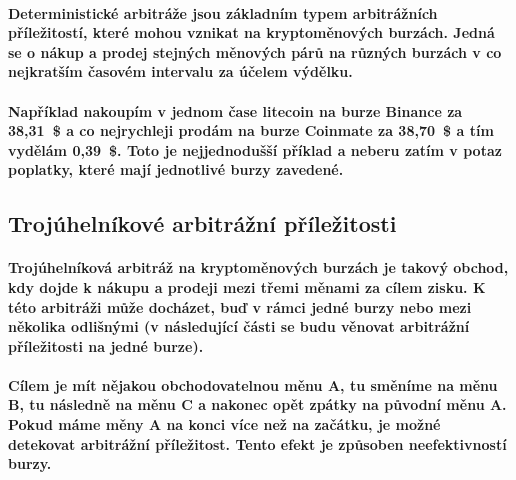 \documentclass[thesis=B,czech]{FITthesis}[2019/03/21]
\begin{document}
\paragraph{
Deterministické arbitráže jsou základním typem arbitrážních příležitostí, které mohou vznikat na kryptoměnových burzách. Jedná se o nákup a prodej stejných měnových párů na různých burzách v co nejkratším časovém intervalu za účelem výdělku. \cite{CZInvestor} \cite{TowardsDataScience}
}
\paragraph{
Například nakoupím v jednom čase litecoin na burze Binance za 38,31~\$ a co nejrychleji prodám na burze Coinmate za 38,70~\$ a tím vydělám 0,39~\$. Toto je nejjednodušší příklad a neberu zatím v potaz poplatky, které mají jednotlivé burzy zavedené. 
}
\subsection{Trojúhelníkové arbitrážní příležitosti}
\paragraph{
Trojúhelníková arbitráž na kryptoměnových burzách je takový obchod, kdy dojde k nákupu a prodeji mezi třemi měnami za cílem zisku. K této arbitráži může docházet, buď v rámci jedné burzy nebo mezi několika odlišnými (v následující části se budu věnovat arbitrážní příležitosti na jedné burze). \cite{TradingStrategy}
}
\paragraph{
Cílem je mít nějakou obchodovatelnou měnu A, tu směníme na měnu B, tu následně na měnu C a nakonec opět zpátky na původní měnu A. Pokud máme měny A na konci více než na začátku, je možné detekovat arbitrážní příležitost. Tento efekt je způsoben neefektivností burzy.
}
\end{document}
